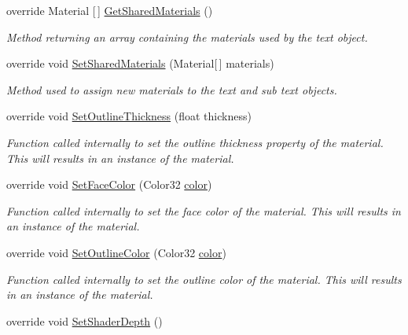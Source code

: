 \begin{DoxyCompactItemize}
override Material \mbox{[}$\,$\mbox{]} \mbox{\hyperlink{class_t_m_pro_1_1_text_mesh_pro_a08e4fa8600f07af3394efbfdc332ecae}{Get\+Shared\+Materials}} ()
\begin{DoxyCompactList}\small\item\em Method returning an array containing the materials used by the text object. \end{DoxyCompactList}\item 
override void \mbox{\hyperlink{class_t_m_pro_1_1_text_mesh_pro_a3d7d7fcab89d108d86a0bb463604267d}{Set\+Shared\+Materials}} (Material\mbox{[}$\,$\mbox{]} materials)
\begin{DoxyCompactList}\small\item\em Method used to assign new materials to the text and sub text objects. \end{DoxyCompactList}\item 
override void \mbox{\hyperlink{class_t_m_pro_1_1_text_mesh_pro_a056fd074419594f0dde096f9b264dc90}{Set\+Outline\+Thickness}} (float thickness)
\begin{DoxyCompactList}\small\item\em Function called internally to set the outline thickness property of the material. This will results in an instance of the material. \end{DoxyCompactList}\item 
override void \mbox{\hyperlink{class_t_m_pro_1_1_text_mesh_pro_a6819493b73133ce05a35daa481101d8e}{Set\+Face\+Color}} (Color32 \mbox{\hyperlink{class_t_m_pro_1_1_t_m_p___text_af874b3b1f2d1565c68e0c3ad9f79e5c4}{color}})
\begin{DoxyCompactList}\small\item\em Function called internally to set the face color of the material. This will results in an instance of the material. \end{DoxyCompactList}\item 
override void \mbox{\hyperlink{class_t_m_pro_1_1_text_mesh_pro_a8a2741c314f991c67d538a7a607d74be}{Set\+Outline\+Color}} (Color32 \mbox{\hyperlink{class_t_m_pro_1_1_t_m_p___text_af874b3b1f2d1565c68e0c3ad9f79e5c4}{color}})
\begin{DoxyCompactList}\small\item\em Function called internally to set the outline color of the material. This will results in an instance of the material. \end{DoxyCompactList}\item 
override void \mbox{\hyperlink{class_t_m_pro_1_1_text_mesh_pro_a3039c7fdff495b48bcefedd0d0d3bc07}{Set\+Shader\+Depth}} ()

\end{DoxyCompactItemize}
